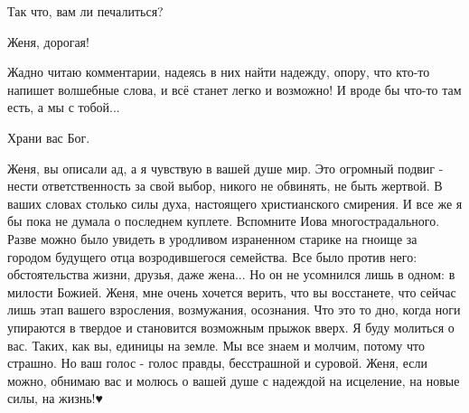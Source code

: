 \begin{itemize}
\begin{itemize}
Так что, вам ли печалиться?
\end{itemize}

 
Женя, дорогая!

Жадно читаю комментарии, надеясь в них найти надежду, опору, что кто-то напишет
волшебные слова, и всё станет легко и возможно! И вроде бы что-то там есть, а
мы с тобой...


 
Храни вас Бог.

 

Женя, вы описали ад, а я чувствую в вашей душе мир. Это огромный подвиг - нести
ответственность за свой выбор, никого не обвинять, не быть жертвой. В ваших
словах столько силы духа, настоящего христианского смирения. И все же я бы пока
не думала о последнем куплете. Вспомните Иова многострадального. Разве можно
было увидеть в уродливом израненном старике на гноище за городом будущего отца
возродившегося семейства. Все было против него: обстоятельства жизни, друзья,
даже жена... Но он не усомнился лишь в одном: в милости Божией. Женя, мне очень
хочется верить, что вы восстанете, что сейчас лишь этап вашего взросления,
возмужания, осознания. Что это то дно, когда ноги упираются в твердое и
становится возможным прыжок вверх. Я буду молиться о вас. Таких, как вы,
единицы на земле. Мы все знаем и молчим, потому что страшно. Но ваш голос -
голос правды, бесстрашной и суровой. Женя, если можно, обнимаю вас и молюсь о
вашей душе с надеждой на исцеление, на новые силы, на жизнь!♥️

 


\end{itemize}
